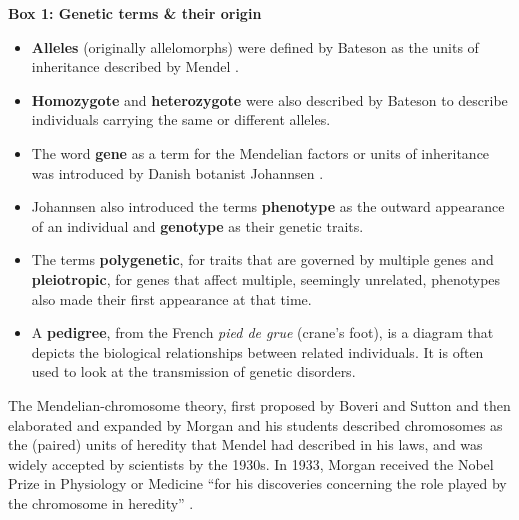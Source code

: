 \begin{Comment}
\hspace{-2.5mm}\textbf{Box 1: Genetic terms \& their origin}\label{box:genetic_terms}
\small
\begin{itemize}
    \item \textbf{Alleles} (originally allelomorphs) were defined by Bateson as the units of inheritance described by Mendel \cite{bateson2013mendel}.
    \item \textbf{Homozygote} and \textbf{heterozygote} were also described by Bateson to describe individuals carrying the same or different alleles.
    \item The word \textbf{gene} as a term for the Mendelian factors or units of inheritance was introduced by Danish botanist Johannsen \cite{johannsen1911genotype}. 
    \item Johannsen also introduced the terms \textbf{phenotype} as the outward appearance of an individual and \textbf{genotype} as their genetic traits. 
    \item The terms \textbf{polygenetic}, for traits that are governed by multiple genes 
    and \textbf{pleiotropic}, for genes that affect multiple, seemingly unrelated, phenotypes 
    also made their first appearance at that time. 
    \item A \textbf{pedigree}, from the French \textit{pied de grue} (crane's foot), is a diagram that depicts the biological relationships between related individuals.
    It is often used to look at the transmission of genetic disorders.
\end{itemize}
\vspace{3mm}
\end{Comment}

\vspace{3mm}

The Mendelian-chromosome theory, first proposed by Boveri and Sutton \cite{sutton1903chromosomes} and then elaborated and expanded by Morgan and his students \cite{morgan1915mechanism} described chromosomes as the (paired) units of heredity that Mendel had described in his laws, and was widely accepted by scientists by the 1930s. 
In 1933, Morgan received the Nobel Prize in Physiology or Medicine “for his discoveries concerning the role played by the chromosome in heredity” \cite{nobel1933nobel}.\\

